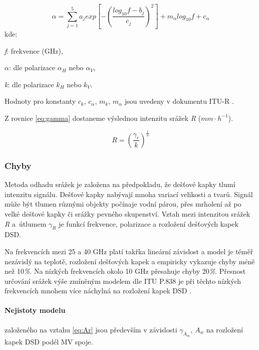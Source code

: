 \documentclass[a4paper,12pt,oneside]{report}
\begin{document}
\begin{equation}
\alpha=\sum_{j=1}^{5} a_{j} exp\left [ -\left ( \frac{log_{10}f-b_{j}}{c_{j}} \right )^{2} \right ]+m{_{\alpha }}log_{10}f+c_{\alpha }
\end{equation} 
kde:

\emph{f}: frekvence (GHz),

\emph{$\alpha$}:  dle polarizace \emph{$\alpha_{H}$} nebo \emph{$\alpha_{V}$},

\emph{k}: dle polarizace  \emph{$k_{H}$} nebo \emph{$k_{V}$}.

{\raggedright{}Hodnoty pro  konstanty  $c_{k}$, $c_{\alpha}$, $m_{k}$, $m_{\alpha }$  jsou uvedeny v dokumentu 
  ITU-R \cite{itu}.}  \bigskip

{\raggedright{}  Z rovnice \eqref{eq:gamma} dostaneme
  výslednou intenzitu srážek \emph{R} ($mm \cdot h^{-1}$). }


\begin{equation}
R=\left ( \frac{\gamma_{r}}{k} \right )^{\frac{1}{\alpha }}
\end{equation}


\subsubsection{Chyby}
\label{subsec:chyby}
Metoda odhadu srážek je založena na předpokladu, že dešťové kapky
tlumí intenzitu signálu. Dešťové kapky nabývají mnoha variací
velikosti a tvarů. Signál může být tlumen různými objekty počínaje vodní
párou, přes mrholení až po velké dešťové
kapky či srážky pevného skupenství. Vztah mezi intenzitou srážek \emph{R} a~útlumem
\emph{$\gamma_{R} $} je funkcí frekvence, polarizace a rozložení
dešťových kapek   \acs{DSD}.

Na frekvencích mezi 25 a 40 GHz platí takřka lineární závislost a
model je téměř nezávislý na teplotě, rozložení dešťových kapek a
empiricky vykazuje chyby méně než 10\emph{\%}. Na nízkých
frekvencích okolo 10 GHz přesahuje chyby 20\emph{\%}. Přesnost
určování srážek výše zmíněným modelem dle ITU P.838 je při těchto
nízkých frekvencích mnohem více náchylná na rozložení
kapek   \acs{DSD} \cite{dsd}.


\paragraph*{Nejistoty modelu} založeného na vztahu \eqref{eq:Ar} jsou
především v závislosti \emph{$\gamma_{A_{m}} $}, \emph{$A_{w} $} na
rozložení kapek   \acs{DSD} podél MV spoje.
\end{document}
